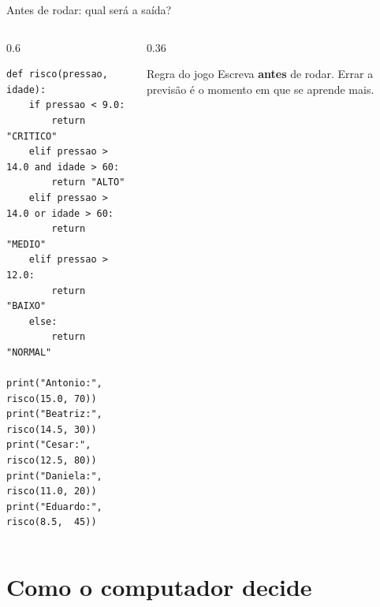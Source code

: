 \documentclass[aspectratio=169]{beamer}
\newcommand{\code}[1]{\texttt{\small #1}}
\begin{document}
\begin{frame}[fragile,shrink=8]{Antes de rodar: qual será a saída?}
  \begin{columns}[T]
    \begin{column}{0.6\textwidth}
\begin{lstlisting}
def risco(pressao, idade):
    if pressao < 9.0:
        return "CRITICO"
    elif pressao > 14.0 and idade > 60:
        return "ALTO"
    elif pressao > 14.0 or idade > 60:
        return "MEDIO"
    elif pressao > 12.0:
        return "BAIXO"
    else:
        return "NORMAL"

print("Antonio:", risco(15.0, 70))
print("Beatriz:", risco(14.5, 30))
print("Cesar:",   risco(12.5, 80))
print("Daniela:", risco(11.0, 20))
print("Eduardo:", risco(8.5,  45))
\end{lstlisting}
    \end{column}
    \begin{column}{0.36\textwidth}
      \begin{exampleblock}{Regra do jogo}
        {\small Escreva \textbf{antes} de rodar. Errar a previsão
        é o momento em que se aprende mais.}
      \end{exampleblock}
    \end{column}
  \end{columns}
\end{frame}

\section{Como o computador decide}
\end{document}
